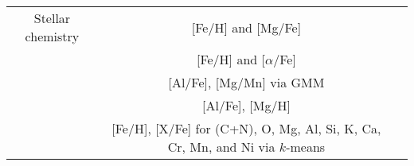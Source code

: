 \begin{table*}
\begin{tabular}{c|c|c}
        \hline
        Stellar chemistry & [Fe/H] and [Mg/Fe] & \citet{DiMatteo2019, DiMatteo2020} \\
        & [Fe/H] and [$\alpha$/Fe] & \citet{Carollo2021} \\
        & [Al/Fe], [Mg/Mn] via GMM & \citet{Das2020} \\
        & [Al/Fe], [Mg/H] & \citet{Feuillet2021} \\
        & [Fe/H], [X/Fe] for (C+N), O, Mg, Al, Si, K, Ca, Cr, Mn, and Ni via $k$-means & \citet{Hayes2018} \\
        \hline
    \end{tabular}
    \label{tab:selection_techniques}
\end{table*}


